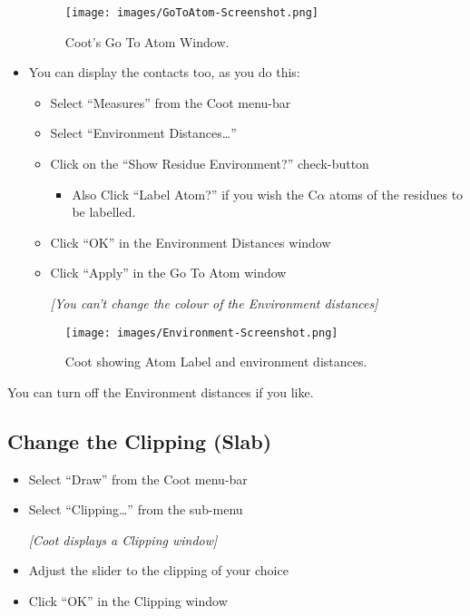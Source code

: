 \documentclass{article}
\begin{document}
\begin{itemize}
\begin{figure}[htbp]
  \begin{center}
    \leavevmode
    \texttt{[image: images/GoToAtom-Screenshot.png]}
    \caption{Coot's Go To Atom Window.}
    \label{fig:goto-atom}
  \end{center}
\end{figure}

\item You can display the contacts too, as you do this:

  \begin{itemize}
  \item Select \textsf{``Measures''} from the Coot menu-bar
  \item Select \textsf{``Environment Distances\ldots''}
  \item Click on the \textsf{``Show Residue Environment?''} check-button
    \begin{itemize}
    \item Also Click \textsf{``Label Atom?''} if you wish the
      C$\alpha$ atoms of the residues to be labelled.
    \end{itemize}
  \item Click \textsf{``OK''} in the Environment Distances window
  \item Click \textsf{``Apply''} in the Go To Atom window

    \emph{[You can't change the colour of the Environment distances]}
  \end{itemize}

  \begin{figure}[htbp]
    \begin{center}
      \leavevmode
      \texttt{[image: images/Environment-Screenshot.png]}
      \caption{Coot showing Atom Label and environment distances.}
      \label{fig:environment}
    \end{center}
  \end{figure}
\end{itemize}

You can turn off the Environment distances if you like.

\subsection{Change the Clipping (Slab)}

\begin{itemize}
\item Select \textsf{``Draw''} from the Coot menu-bar
\item Select \textsf{``Clipping\ldots''} from the sub-menu

\textsl{ [Coot displays a Clipping window]}

\item Adjust the slider to the clipping of your choice
\item Click \textsf{``OK''} in the Clipping window
\end{itemize}
\end{document}
